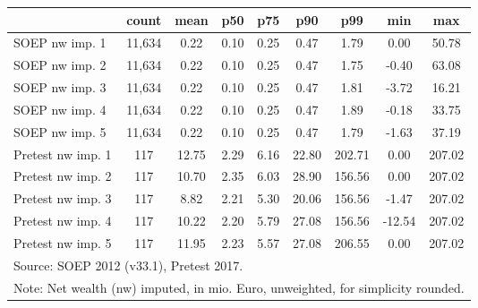 {
\def\sym#1{\ifmmode^{#1}\else\(^{#1}\)\fi}
\begin{tabular}{l*{1}{cccccccc}}
\hline\hline
                                            &       count&        mean&         p50&         p75&         p90&         p99&         min&         max\\
\hline
SOEP nw imp. 1                              &      11,634&        0.22&        0.10&        0.25&        0.47&        1.79&        0.00&       50.78\\
SOEP nw imp. 2                              &      11,634&        0.22&        0.10&        0.25&        0.47&        1.75&       -0.40&       63.08\\
SOEP nw imp. 3                              &      11,634&        0.22&        0.10&        0.25&        0.47&        1.81&       -3.72&       16.21\\
SOEP nw imp. 4                              &      11,634&        0.22&        0.10&        0.25&        0.47&        1.89&       -0.18&       33.75\\
SOEP nw imp. 5                              &      11,634&        0.22&        0.10&        0.25&        0.47&        1.79&       -1.63&       37.19\\
Pretest nw imp. 1                           &         117&       12.75&        2.29&        6.16&       22.80&      202.71&        0.00&      207.02\\
Pretest nw imp. 2                           &         117&       10.70&        2.35&        6.03&       28.90&      156.56&        0.00&      207.02\\
Pretest nw imp. 3                           &         117&        8.82&        2.21&        5.30&       20.06&      156.56&       -1.47&      207.02\\
Pretest nw imp. 4                           &         117&       10.22&        2.20&        5.79&       27.08&      156.56&      -12.54&      207.02\\
Pretest nw imp. 5                           &         117&       11.95&        2.23&        5.57&       27.08&      206.55&        0.00&      207.02\\
\hline\hline
\multicolumn{9}{l}{\footnotesize Source: SOEP 2012 (v33.1), Pretest 2017.}\\
\multicolumn{9}{l}{\footnotesize Note: Net wealth (nw) imputed, in mio. Euro, unweighted, for simplicity rounded.}\\
\end{tabular}
}
